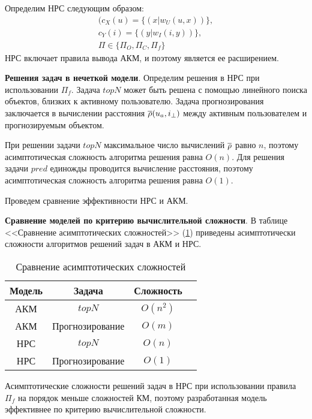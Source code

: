 %
Определим НРС следующим образом:
	\begin{multline}
		(c_X(u) = \{(x | w_U(u, x )) \},\\
		 c_Y(i) = \{(y | w_I(i, y )) \},\\
		\Pi \in \{\Pi_{O}, \Pi_{C}, \Pi_f\}
	\end{multline}
НРС включает правила вывода АКМ,
и поэтому является ее расширением.

{\bf Решения задач в нечеткой модели}.
Определим решения в НРС при использовании $\Pi_f$. Задача $topN$ может быть решена
с помощью линейного поиска объектов, близких к активному пользователю.
Задача прогнозирования заключается в вычислении расстояния $\overline{\rho}(u_a, i_{\bot})$ между
активным пользователем и прогнозируемым объектом.

При решении задачи $topN$ максимальное число вычислений $\overline{\rho}$ равно $n$,
поэтому асимптотическая сложность алгоритма решения равна $O(n)$. Для решения
задачи $pred$ единожды проводится вычисление расстояния,
поэтому асимптотическая сложность алгоритма решения равна $O(1)$.

Проведем сравнение эффективности НРС и АКМ.

{\bf Сравнение моделей по критерию вычислительной сложности}.
В таблице <<Сравнение асимптотических сложностей>> (\ref{tbl:complex})
приведены асимптотически сложности алгоритмов решений задач в АКМ и НРС.

\begin{table}[h]
	\caption{Сравнение асимптотических сложностей}
	\label{tbl:complex}
  \begin{center}
  \begin{tabular}{|c|c|c|c|}
	\hline
	Модель & Задача & Сложность  \\ \hline
	АКМ & $topN$ & $O(n^2)$  \\ \hline
	АКМ & Прогнозирование & $O(m)$ \\ \hline
	НРС & $topN$ & $O(n)$ \\ \hline
	НРС & Прогнозирование & $O(1)$ \\ \hline
  \end{tabular}
\end{center}
\end{table}
Асимптотические сложности решений задач в НРС
при использовании правила $\Pi_f$ на порядок меньше сложностей
КМ, поэтому разработанная модель эффективнее по критерию
вычислительной сложности.

